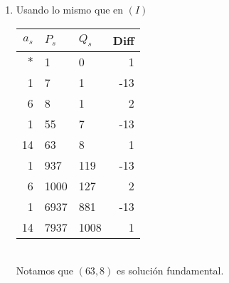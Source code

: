 \begin{sol}
\begin{enumerate}[label = (\roman*)]
		\item Usando lo mismo que en $(I)$\\
		      \begin{tabular}{| r | l | l | r |}
			      \hline
			      $a_s$ & $P_s$ & $Q_s$ & Diff \\
			      \hline\hline
			      $*$   & 1     & 0     & 1    \\
			      \hline
			      1     & 7     & 1     & -13  \\
			      \hline
			      6     & 8     & 1     & 2    \\
			      \hline
			      1     & 55    & 7     & -13  \\
			      \hline
			      14    & 63    & 8     & 1    \\
			      \hline
			      1     & 937   & 119   & -13  \\
			      \hline
			      6     & 1000  & 127   & 2    \\
			      \hline
			      1     & 6937  & 881   & -13  \\
			      \hline
			      14    & 7937  & 1008  & 1    \\
			      \hline
		      \end{tabular}\\
		      Notamos que $(63,8)$ es solución fundamental.
	\end{enumerate}
\end{sol}

